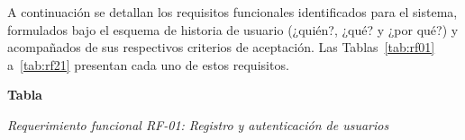\label{sec:ieee_requisitos_especificos}

\label{sec:ieee_rf}

A continuación se detallan los requisitos funcionales identificados para el sistema, formulados bajo el esquema de historia de usuario (¿quién?, ¿qué? y ¿por qué?) y acompañados de sus respectivos criterios de aceptación. Las Tablas~\ref{tab:rf01} a~\ref{tab:rf21} presentan cada uno de estos requisitos.

\label{tab:rf01}
\noindent\textbf{Tabla~\thetable}\par\nopagebreak
\noindent\textit{Requerimiento funcional RF-01: Registro y autenticación de usuarios}\par\nopagebreak
\begingroup
\setlength{\LTleft}{0pt}\setlength{\LTright}{\fill}
